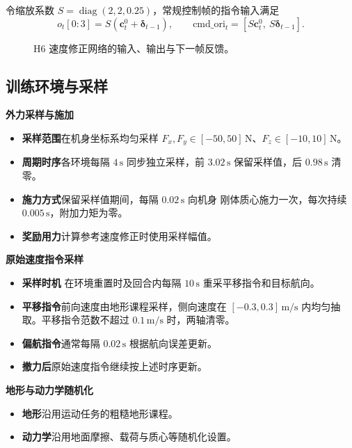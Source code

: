 令缩放系数 $S=\operatorname{diag}(2,2,0.25)$，常规控制帧的指令输入满足
\begin{equation}
 o_t[0{:}3]=S(\bm c^0_t+\bm\delta_{t-1}),\qquad
 \mathrm{cmd\_ori}_t=[S\bm c^0_t,\ S\bm\delta_{t-1}].
\label{eq:redundant}
\end{equation}

\begin{figure}[!htbp]
\centering

\caption{H6 速度修正网络的输入、输出与下一帧反馈。}
\label{fig:h6-network-feedback}
\end{figure}

\clearpage
\subsection{训练环境与采样}

\noindent\textbf{外力采样与施加}
\begin{itemize}
  \item \textbf{采样范围}\enspace 在机身坐标系均匀采样 $F_x,F_y\in[-50,50]\,\mathrm N$、$F_z\in[-10,10]\,\mathrm N$。
  \item \textbf{周期时序}\enspace 各环境每隔 $4\,\mathrm{s}$ 同步独立采样，前 $3.02\,\mathrm{s}$ 保留采样值，后 $0.98\,\mathrm{s}$ 清零。
  \item \textbf{施力方式}\enspace 保留采样值期间，每隔 $0.02\,\mathrm{s}$ 向机身  刚体质心施力一次，每次持续 $0.005\,\mathrm{s}$，附加力矩为零。
  \item \textbf{奖励用力}\enspace 计算参考速度修正时使用采样幅值。
\end{itemize}

\noindent\textbf{原始速度指令采样}
\begin{itemize}
  \item \textbf{采样时机}\enspace {} 在环境重置时及回合内每隔 $10\,\mathrm{s}$ 重采平移指令和目标航向。
  \item \textbf{平移指令}\enspace 前向速度由地形课程采样，侧向速度在 $[-0.3,0.3]\,\mathrm{m/s}$ 内均匀抽取。平移指令范数不超过 $0.1\,\mathrm{m/s}$ 时，两轴清零。
  \item \textbf{偏航指令}\enspace 通常每隔 $0.02\,\mathrm{s}$ 根据航向误差更新。
  \item \textbf{撤力后}\enspace 原始速度指令继续按上述时序更新。
\end{itemize}

\noindent\textbf{地形与动力学随机化}
\begin{itemize}
  \item \textbf{地形}\enspace 沿用运动任务的粗糙地形课程。
  \item \textbf{动力学}\enspace 沿用地面摩擦、载荷与质心等随机化设置。
\end{itemize}

